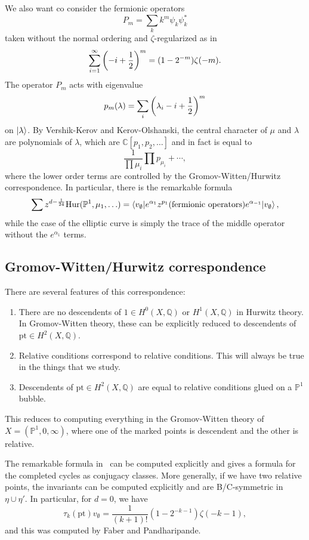 \documentclass[leqno, openany]{memoir}
\theoremstyle{definition}
\theoremstyle{remark}
\theoremstyle{plain}
\theoremstyle{definition}
\theoremstyle{remark}
\newcommand{\C}{\mathbb{C}}
\newcommand{\Q}{\mathbb{Q}}
\renewcommand{\P}{\mathbb{P}}
\newcommand{\mr}[1]{\mathrm{#1}}
\begin{document}
We also want co consider the fermionic operators
\[ P_m = \sum_k k^m \psi_k \psi_k^* \]
taken without the normal ordering and $\zeta$-regularized as in
\[ \sum_{i=1}^{\infty} \qty(-i + \frac{1}{2})^m = (1-2^{-m})\zeta(-m). \]
The operator $P_m$ acts with eigenvalue
\[ p_m(\lambda) = \sum_i \qty(\lambda_i - i + \frac{1}{2})^m \]
on $\ket{\lambda}$. By Vershik-Kerov and Kerov-Olshanski, the central character of $\mu$ and $\lambda$ are polynomials of $\lambda$, which are $\C[p_1, p_2, \ldots]$ and in fact is equal to
\[ \frac{1}{\prod \mu_i} \prod p_{\mu_i} + \cdots, \]
where the lower order terms are controlled by the Gromov-Witten/Hurwitz correspondence. In particular, there is the remarkable formula
\[ \sum z^{d-\frac{1}{24}} \mr{Hur}(\P^1, \mu_1, \ldots) = \mel**{v_{\emptyset}}{e^{\alpha_1} z^{p_1} (\text{fermionic operators}) e^{\alpha_{-1}}}{v_{\emptyset}}, \]
while the case of the elliptic curve is simply the trace of the middle operator without the $e^{\alpha_1}$ terms.

\subsection{Gromov-Witten/Hurwitz correspondence}

There are several features of this correspondence:
\begin{enumerate}
    \item There are no descendents of $1 \in H^0(X, \Q)$ or $H^1(X, \Q)$ in Hurwitz theory. In Gromov-Witten theory, these can be explicitly reduced to descendents of $\mr{pt} \in H^2(X, \Q)$.
    \item Relative conditions correspond to relative conditions. This will always be true in the things that we study.
    \item Descendents of $\mr{pt} \in H^2(X, \Q)$ are equal to relative conditions glued on a $\P^1$ bubble.
\end{enumerate}
This reduces to computing everything in the Gromov-Witten theory of $X = (\P^1, 0, \infty)$, where one of the marked points is descendent and the other is relative.

The remarkable formula in~ can be computed explicitly and gives a formula for the completed cycles as conjugacy classes. More generally, if we have two relative points, the invariants can be computed explicitly and are B/C-symmetric in $\eta \cup \eta'$. In particular, for $d = 0$, we have
\[ \tau_k(\mr{pt}) v_{\emptyset} = \frac{1}{(k+1)!}(1-2^{-k-1}) \zeta(-k-1), \]
and this was computed by Faber and Pandharipande.
\end{document}
